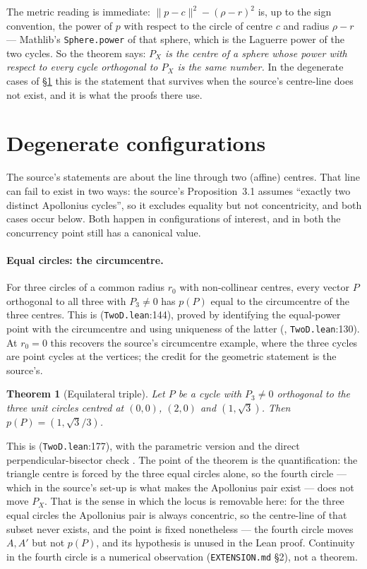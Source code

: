 \documentclass[11pt]{article}
\newtheorem{theorem}{Theorem}
\theoremstyle{definition}
\theoremstyle{remark}
\newcommand{\src}[3]{\texttt{#2}:#3}
\begin{document}
The metric reading is immediate: $\lVert p-c\rVert^2-(\rho-r)^2$ is, up to the sign convention, the
power of $p$ with respect to the circle of centre $c$ and radius $\rho-r$ --- Mathlib's
\texttt{Sphere.power} of that sphere, which is the Laguerre power of the two cycles. So the theorem says: \emph{$P_X$ is the centre of a sphere whose power with
respect to every cycle orthogonal to $P_X$ is the same number.} In the degenerate cases of
\S\ref{sec:degenerate} this is the statement that survives when the source's centre-line does not
exist, and it is what the proofs there use.

\section{Degenerate configurations}\label{sec:degenerate}

The source's statements are about the line through two (affine) centres. That line can fail to exist
in two ways: the source's Proposition~3.1 assumes ``exactly two distinct Apollonius cycles'', so it
excludes equality but not concentricity, and both cases occur below. Both happen in configurations of interest, and in both the concurrency point still
has a canonical value.

\paragraph{Equal circles: the circumcentre.} For three circles of a common radius $r_0$ with
non-collinear centres, every vector $P$ orthogonal to all three with $P_3\neq0$ has $p(P)$ equal to
the circumcentre of the three centres. This is  (\src{PaperK}{TwoD.lean}{144}), proved by
identifying the equal-power point with the circumcentre and using uniqueness of the latter
(, \src{PaperK}{TwoD.lean}{130}). At $r_0=0$ this recovers
the source's circumcentre example, where the three cycles are point cycles at the vertices; the
credit for the geometric statement is the source's.

\begin{theorem}[Equilateral triple]\label{thm:equilateral}
Let $P$ be a cycle with $P_3\neq0$ orthogonal to the three unit circles centred at $(0,0)$, $(2,0)$
and $(1,\sqrt3)$. Then $p(P)=(1,\sqrt3/3)$.
\end{theorem}

This is  (\src{PaperK}{TwoD.lean}{177}), with the parametric version
 and the direct perpendicular-bisector check
. The point of the theorem is the quantification: the
triangle centre is forced by the three equal circles alone, so the fourth circle --- which in the
source's set-up is what makes the Apollonius pair exist --- does not move $P_X$. That is the sense in which the locus is
removable here: for the three equal circles the Apollonius pair is always concentric, so the
centre-line of that subset never exists, and the point is fixed nonetheless --- the fourth circle
moves $A,A'$ but not $p(P)$, and its hypothesis is unused in the Lean proof. Continuity in the fourth
circle is a numerical observation (\texttt{EXTENSION.md} \S2), not a theorem.
\end{document}

